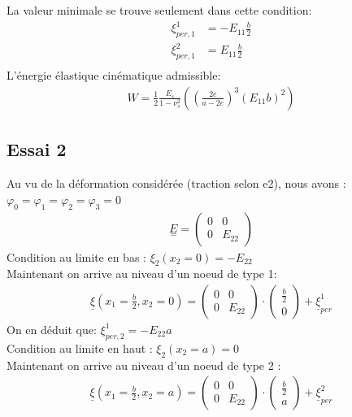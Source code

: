\documentclass{article}
\begin{document}
La valeur minimale se trouve seulement dans cette condition:\\
\begin{align*}
    \xi_{per,1}^{1}&=-E_{11}\frac{b}{2}\\
    \xi_{per,1}^{2}&=E_{11}\frac{b}{2}\\
\end{align*}
L'énergie élastique cinématique admissible:\\
\begin{align*}
    W=\frac{1}{2}\frac{E_{s}}{1-\nu_{s}^{2}}((\frac{2e}{a-2e})^{3}(E_{11}b)^{2})
\end{align*}

\subsection{Essai \large{\textcircled{\small{2}}}}
Au vu de la déformation considérée (traction selon e2), nous avons : $\varphi_{0}=\varphi_{1}=\varphi_{2}=\varphi_{3}=0$\\
\begin{align*}
    \underset{=}{E}=\begin{pmatrix}0&0\\0&E_{22}\end{pmatrix}
\end{align*}
Condition au limite en bas : $\xi_{2}(x_{2}=0)=-E_{22}$ \\
Maintenant on arrive au niveau d'un noeud de type 1:\\
\begin{align*}
    \underline{\xi}(x_{1}=\frac{b}{2},x_{2}=0)=\begin{pmatrix}0&0\\0&E_{22}\end{pmatrix}\cdot\begin{pmatrix}\frac{b}{2}\\0\end{pmatrix}+\underline{\xi}_{per}^{1}
\end{align*}
On en déduit que: $\xi_{per,2}^{1}=-E_{22}a$\\
Condition au limite en haut : $\xi_{2}(x_{2}=a)=0$ \\
Maintenant on arrive au niveau d’un noeud de type 2 :\\
\begin{align*}
    \underline{\xi}(x_{1}=\frac{b}{2},x_{2}=a)=\begin{pmatrix}0&0\\0&E_{22}\end{pmatrix}\cdot\begin{pmatrix}\frac{b}{2}\\a\end{pmatrix}+\underline{\xi}_{per}^{2}
\end{align*}
\end{document}
